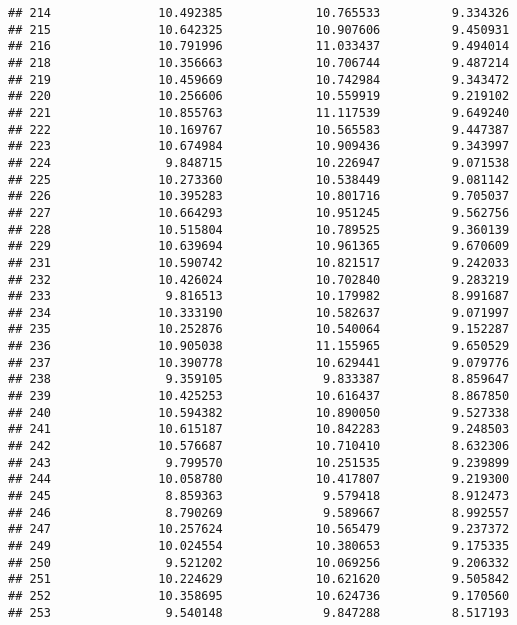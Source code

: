 \documentclass[
]{article}
\begin{document}
\begin{verbatim}
## 214               10.492385             10.765533          9.334326
## 215               10.642325             10.907606          9.450931
## 216               10.791996             11.033437          9.494014
## 218               10.356663             10.706744          9.487214
## 219               10.459669             10.742984          9.343472
## 220               10.256606             10.559919          9.219102
## 221               10.855763             11.117539          9.649240
## 222               10.169767             10.565583          9.447387
## 223               10.674984             10.909436          9.343997
## 224                9.848715             10.226947          9.071538
## 225               10.273360             10.538449          9.081142
## 226               10.395283             10.801716          9.705037
## 227               10.664293             10.951245          9.562756
## 228               10.515804             10.789525          9.360139
## 229               10.639694             10.961365          9.670609
## 231               10.590742             10.821517          9.242033
## 232               10.426024             10.702840          9.283219
## 233                9.816513             10.179982          8.991687
## 234               10.333190             10.582637          9.071997
## 235               10.252876             10.540064          9.152287
## 236               10.905038             11.155965          9.650529
## 237               10.390778             10.629441          9.079776
## 238                9.359105              9.833387          8.859647
## 239               10.425253             10.616437          8.867850
## 240               10.594382             10.890050          9.527338
## 241               10.615187             10.842283          9.248503
## 242               10.576687             10.710410          8.632306
## 243                9.799570             10.251535          9.239899
## 244               10.058780             10.417807          9.219300
## 245                8.859363              9.579418          8.912473
## 246                8.790269              9.589667          8.992557
## 247               10.257624             10.565479          9.237372
## 249               10.024554             10.380653          9.175335
## 250                9.521202             10.069256          9.206332
## 251               10.224629             10.621620          9.505842
## 252               10.358695             10.624736          9.170560
## 253                9.540148              9.847288          8.517193

\end{verbatim}
\end{document}
